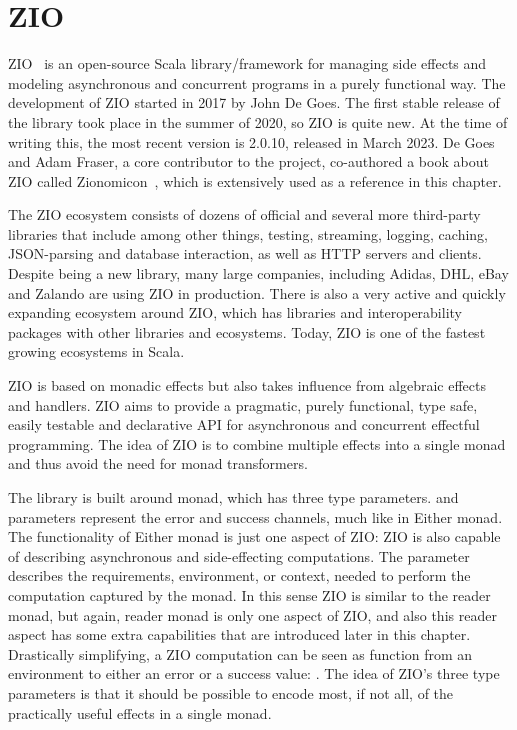 \chapter{ZIO} \label{zio}

ZIO~\cite{zio} is an open-source Scala library/framework for managing side effects and modeling asynchronous and concurrent programs in a purely functional way. The development of ZIO started in 2017 by John De Goes. The first stable release of the library took place in the summer of 2020, so ZIO is quite new. At the time of writing this, the most recent version is 2.0.10, released in March 2023. De Goes and Adam Fraser, a core contributor to the project, co-authored a book about ZIO called Zionomicon~\cite{zionomicon}, which is extensively used as a reference in this chapter.

The ZIO ecosystem consists of dozens of official and several more third-party libraries that include among other things, testing, streaming, logging, caching, JSON-parsing and database interaction, as well as HTTP servers and clients. Despite being a new library, many large companies, including Adidas, DHL, eBay and Zalando are using ZIO in production. There is also a very active and quickly expanding ecosystem around ZIO, which has libraries and interoperability packages with other libraries and ecosystems. Today, ZIO is one of the fastest growing ecosystems in Scala.

ZIO is based on monadic effects but also takes influence from algebraic effects and handlers. ZIO aims to provide a pragmatic, purely functional, type safe, easily testable and declarative API for asynchronous and concurrent effectful programming. The idea of ZIO is to combine multiple effects into a single monad and thus avoid the need for monad transformers.

The library is built around  monad, which has three type parameters.  and  parameters represent the error and success channels, much like in Either monad. The functionality of Either monad is just one aspect of ZIO: ZIO is also capable of describing asynchronous and side-effecting computations. The  parameter describes the requirements, environment, or context, needed to perform the computation captured by the monad. In this sense ZIO is similar to the reader monad, but again, reader monad is only one aspect of ZIO, and also this reader aspect has some extra capabilities that are introduced later in this chapter. Drastically simplifying, a ZIO computation can be seen as function from an environment to either an error or a success value: . The idea of ZIO's three type parameters is that it should be possible to encode most, if not all, of the practically useful effects in a single monad. 

